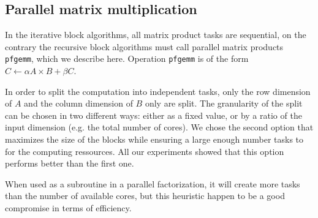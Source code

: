 \documentclass{article}
\newcommand{\pfgemm}{\texttt{pfgemm}\xspace}
\begin{document}
 
 
 
 
 
 
 
 
 



 
 
 


\subsection{Parallel matrix multiplication}

In the iterative block algorithms, all matrix product tasks are sequential, on
the contrary the recursive block algorithms must call parallel matrix products
\pfgemm, which we describe here. Operation \pfgemm is of the form 
$C \leftarrow \alpha  A \times B+\beta C$.
 
 
 
 
 
 
 
 
 
 
 
 
 
 
 
 
 
 
In order to split the computation into independent tasks, only the row
dimension of $A$ and the column dimension of $B$ only are split. 
The granularity of the split can be chosen in two different ways: either as a
fixed value, or by a ratio of the input dimension (e.g. the total number of
cores).
We chose the second option that maximizes the size of the blocks while ensuring
a large enough number tasks to for the computing ressources. All our experiments
showed that this option performs better than the first one. 
 
When used as a subroutine in a parallel factorization, it will create more tasks
than the number of available cores, but this heuristic happen to be a good
compromise in terms of efficiency. 

 
 
 
 
 
 
 
 
 
 
 
 
 
 
 
 
    
 
 
 
 
 
 
 
 
 
\end{document}

